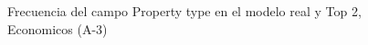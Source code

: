 \begin{figure}[H]
    \centering
    
    \caption{Frecuencia del campo Property type en el modelo real y Top 2, Economicos (A-3)}
    \label{frecuency-Property Type-top2}
\end{figure}